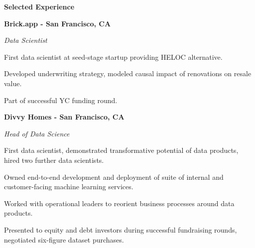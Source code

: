 \documentclass{res}
\begin{document}
{\begin{resume}
\begin{minipage}{7.6in}
\vspace{8mm}
\hrulefill\textbf{\hspace{2mm}Selected Experience\hspace{2mm}}\hrulefill
\vspace{2.5mm}




\textbf{Brick.app - San Francisco, CA}

\vspace{0.75mm}
{\it Data Scientist}  
\vspace{0.5mm}
\begin{list}{}{\leftmargin=1em}\itemsep-2pt
\item First data scientist at seed-stage startup providing HELOC alternative.
\item Developed underwriting strategy, modeled causal impact of renovations on resale value.
\item Part of successful YC funding round.
\end{list}

\vspace{3mm}
\textbf{Divvy Homes - San Francisco, CA}

\vspace{0.75mm}
{\it Head of Data Science}  
\vspace{0.5mm}
\begin{list}{}{\leftmargin=1em}\itemsep-2pt
\item First data scientist, demonstrated transformative potential of data products, hired two further data scientists.
\item Owned end-to-end development and deployment of suite of internal and customer-facing machine learning services.
\item Worked with operational leaders to reorient business processes around data products.
\item Presented to equity and debt investors during successful fundraising rounds, negotiated six-figure dataset purchases.
\end{list}


\end{minipage}
\end{resume}}
\end{document}
